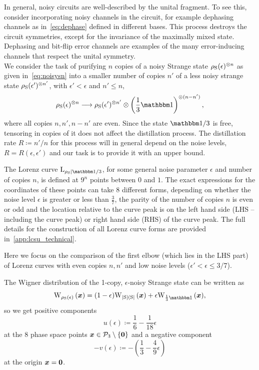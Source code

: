 \documentclass[pra,
aps,
twocolumn,
superscriptaddress,
groupedaddress,
nofootinbib,
reprint
]{revtex4-1}
\begin{document}
In general, noisy circuits are well-described by the unital fragment.
To see this, consider incorporating noisy channels in the circuit, for example dephasing channels as in~\cref{eq:dephase} defined in different bases.
This process destroys the circuit symmetries, except for the invariance of the maximally mixed state.
Dephasing and bit-flip error channels are examples of the many error-inducing channels that respect the unital symmetry. 
\null\\

We consider the task of purifying $n$ copies of a noisy Strange state $\rho_{\rm{S}}(\epsilon)^{\otimes n}$ as given in~\cref{eq:noisysn} into a smaller number of copies $n'$ of a less noisy strange state $\rho_{\rm{S}}(\epsilon')^{\otimes n'}$, with $\epsilon' < \epsilon$ and $n' \leq n$,
\begin{equation}\label{eq:sudist}
	\rho_{\rm{S}}(\epsilon)^{\otimes n} \longrightarrow \rho_{\rm{S}}(\epsilon')^{\otimes n'} \otimes \left( \frac{1}{3}\id \right)^{\otimes (n-n')},
\end{equation}
where all copies $n, n', n - n'$ are even.
Since the state $\id / 3$ is free, tensoring in copies of it does not affect the distillation process.
The distillation rate $R \coloneqq n'/n$ for this process will in general depend on the noise levels, $R = R(\epsilon, \epsilon')$ and our task is to provide it with an upper bound.

The Lorenz curve $\lc{\rho_{\rm{S}}}{\id/3}$, for some general noise parameter $\epsilon$ and number of copies $n$, is defined at $9^n$ points between $0$ and $1$.
The exact expressions for the coordinates of these points can take $8$ different forms, depending on whether the noise level $\epsilon$ is greater or less than $\frac{3}{7}$, the parity of the number of copies $n$ is even or odd and the location relative to the curve peak is on the left hand side (LHS -- including the curve peak) or right hand side (RHS) of the curve peak.
The full details for the construction of all Lorenz curve forms are provided in~\cref{app:lcsu_technical}.

Here we focus on the comparison of the first elbow (which lies in the LHS part) of Lorenz curves with even copies $n, n'$ and low noise levels ($\epsilon' < \epsilon \leq 3/7$).

The Wigner distribution of the 1-copy, $\epsilon$-noisy Strange state can be written as 
\begin{equation}
	\W[\bmx]{\rho_{\rm{S}}(\epsilon)} = (1-\epsilon)\W[\bmx]{\ketbra{\rm{S}}} + \epsilon\W[\bmx]{\frac{1}{3}\id},
\end{equation}
so we get positive components
\begin{equation}
	u(\epsilon) \coloneqq \frac{1}{6} -\frac{1}{18}\epsilon
\end{equation}
at the 8 phase space points $\bm{x} \in \mathcal{P}_3 \setminus \{\bm{0}\}$ and a negative component
\begin{equation}
	- v(\epsilon) \coloneqq - \left( \frac{1}{3} -\frac{4}{9}\epsilon \right)
\end{equation}
at the origin $\bm{x} = \bm{0}$.
\end{document}
